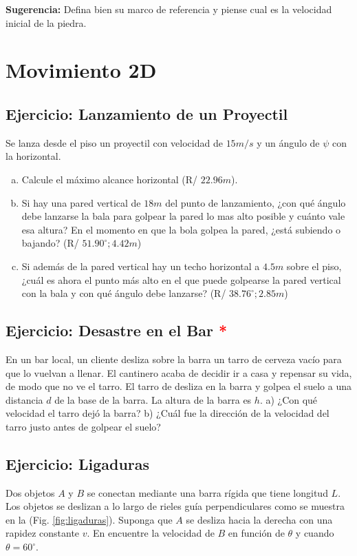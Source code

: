 \documentclass{replab}
\begin{document}
	\textbf{Sugerencia:} Defina bien su marco de referencia y piense cual es la velocidad inicial de la piedra.

	\section{Movimiento 2D}

	\subsection{Ejercicio: Lanzamiento de un Proyectil}
	Se lanza desde el piso un proyectil con velocidad de $15m/s$ y un ángulo de $\psi$ con la horizontal.

	\begin{enumerate}[a)]
		\item Calcule el máximo alcance horizontal (R/ $22.96m$).
		\item Si hay una pared vertical de $18m$ del punto de lanzamiento, ¿con qué ángulo debe lanzarse la bala para golpear la pared lo mas alto posible y cuánto vale esa altura? En el momento en que la bola golpea la pared, ¿está subiendo o bajando? (R/ $51.90^{\circ}; 4.42m$)
		\item Si además de la pared vertical hay un techo horizontal a $4.5m$ sobre el piso, ¿cuál es ahora el punto más alto en el que puede golpearse la pared vertical con la bala y con qué ángulo debe lanzarse? (R/ $38.76^{\circ}; 2.85m$)
	\end{enumerate}

	\subsection{Ejercicio: Desastre en el Bar \textcolor{red}{*}}
	En un bar local, un cliente desliza sobre la barra un tarro de cerveza vacío para que lo vuelvan a llenar. El cantinero acaba de decidir ir a casa y repensar su vida, de modo que no ve el tarro. El tarro de desliza en la barra y golpea el suelo a una distancia $d$ de la base de la barra. La altura de la barra es $h$. a) ¿Con qué velocidad el tarro dejó la barra? b) ¿Cuál fue la dirección de la velocidad del tarro justo antes de golpear el suelo?

	\subsection{Ejercicio: Ligaduras}
	Dos objetos $A$ y $B$ se conectan mediante una barra rígida que tiene longitud $L$. Los objetos se deslizan a lo largo de rieles guía perpendiculares como se muestra en la (Fig. \ref{fig:ligaduras}). Suponga que $A$ se desliza hacia la derecha con una rapidez constante $v$. En encuentre la velocidad de $B$ en función de $\theta$ y cuando $\theta = 60^{\circ}$.\\
\end{document}
